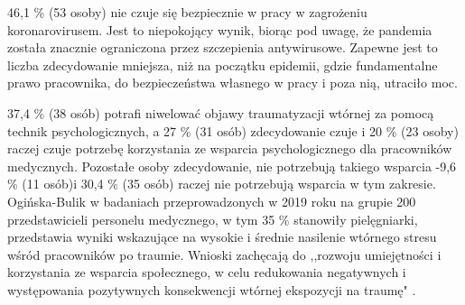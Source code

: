 \documentclass[a4paper,12pt,twoside,openany]{report}
\begin{document}
46,1 \% (53 osoby) nie  czuje się bezpiecznie w pracy w zagrożeniu koronarovirusem. Jest to niepokojący wynik, biorąc pod uwagę, że pandemia została znacznie ograniczona przez szczepienia antywirusowe. Zapewne jest to liczba zdecydowanie mniejsza, niż na początku epidemii, gdzie fundamentalne prawo pracownika, do bezpieczeństwa własnego w pracy i poza nią, utraciło moc.

 37,4 \% (38 osób) potrafi niwelować objawy traumatyzacji wtórnej za pomocą technik psychologicznych, a 27 \% (31 osób) zdecydowanie czuje i 20 \% (23 osoby) raczej czuje potrzebę korzystania ze wsparcia psychologicznego dla pracowników medycznych. Pozostałe osoby zdecydowanie, nie potrzebują takiego wsparcia -9,6 \%  (11 osób)i 30,4 \% (35 osób) raczej nie potrzebują wsparcia w tym zakresie. Ogińska-Bulik w badaniach przeprowadzonych w 2019 roku na grupie 200 przedstawicieli personelu medycznego, w tym 35 \% stanowiły pielęgniarki, przedstawia wyniki wskazujące na wysokie i średnie nasilenie wtórnego stresu wśród pracowników po traumie. Wnioski zachęcają do ,,rozwoju umiejętności i korzystania ze wsparcia społecznego, w celu redukowania negatywnych i występowania pozytywnych konsekwencji wtórnej ekspozycji na traumę" \cite{trauma}. 

\end{document}

